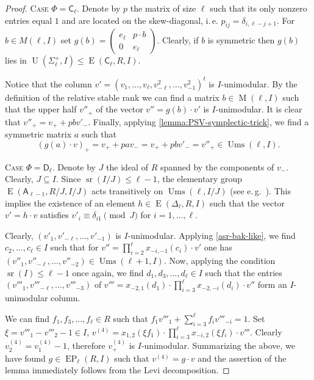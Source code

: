 \documentclass[11pt]{amsart}
\theoremstyle{plain}
\numberwithin{equation}{section}
\numberwithin{lemma}{section}
\theoremstyle{definition}
\theoremstyle{remark}
\DeclareMathOperator{\E}{E}
\DeclareMathOperator{\EP}{EP}
\DeclareMathOperator{\U}{U}
\DeclareMathOperator{\M}{M}
\DeclareMathOperator{\sr}{sr}
\DeclareMathOperator{\Ums}{Ums}
\newcommand{\rA}{\mathsf{A}}
\newcommand{\rC}{\mathsf{C}}
\newcommand{\rD}{\mathsf{D}}
\begin{document}
\begin{proof} 
\textsc{Case $\Phi=\rC_\ell$.}
Denote by $p$ the matrix of size $\ell$ such that its only nonzero entries equal $1$ and are located on the skew-diagonal, i.\,e. $p_{ij}=\delta_{i, \ell-j+1}$. 
For $b \in M(\ell, I)$ set $g(b)=\left(\begin{smallmatrix} e_\ell & p \cdot b \\ 0 & e_{\ell} \end{smallmatrix}\right)$.
Clearly, if $b$ is symmetric then $g(b)$ lies in $\U(\Sigma_\ell^+, I)\leq \E(\rC_\ell, R, I)$.

Notice that the column $v'=(v_1,\ldots,v_\ell, v_{-\ell}^2,\ldots,v_{-1}^2)^t$ is $I$-unimodular.
By the definition of the relative stable rank we can find a matrix $b\in \M(\ell,I)$ such that the upper half $v''_+$ of the vector $v''= g(b) \cdot v'$ is $I$-unimodular.
It is clear that $v''_+ = v_+ + pb v'_-$. 
Finally, applying \cref{lemma:PSV-symplectic-trick}, we find a symmetric matrix $a$ such that
\[ (g(a)\cdot v)_+=v_+ + pav_- = v_+ + pbv'_- = v''_+ \in \Ums(\ell, I). \]

\textsc{Case $\Phi=\rD_\ell$.} Denote by $J$ the ideal of $R$ spanned by the components of $v_{-}$. Clearly, $J \subseteq I$.
Since $\sr(I/J) \leqslant \ell-1$, the elementary group $\E(\rA_{\ell-1}, R/J, I/J)$ acts transitively on $\Ums(\ell, I/J)$ (see e.\,g.~\cite[Theorem~2.3c]{Va69}). 
This implies the existence of an element $h\in \E(\Delta_\ell, R, I)$ such that the vector $v' = h \cdot v$ satisfies $v'_i \equiv \delta_{i1} \pmod J$ for $i=1, \ldots, \ell$.

Clearly, $(v'_1, v'_{-\ell}, \ldots, v'_{-1})$ is $I$-unimodular.
Applying \cref{asr-bak-like}, we find $c_2, \ldots, c_\ell\in I$ such that for $v''= \prod_{i=2}^{\ell}x_{-i, -1}(c_i)\cdot v'$ one has
$(v''_1, v''_{-\ell},\ldots, v''_{-2})\in\Ums(\ell+1, I)$.
Now, applying the condition $\sr(I) \leqslant \ell-1$ once again, we find
$d_1, d_3, \ldots, d_{\ell}\in I$ such that the entries $(v'''_1, v'''_{-\ell}, \ldots, v'''_{-3})$
of $v'''=x_{-2, 1}(d_1) \cdot \prod_{i=3}^{\ell} x_{-2, -i}(d_i) \cdot v''$ form an $I$-unimodular column.

We can find $f_1, f_3,\ldots, f_\ell \in R$ such that $f_1v'''_1+\sum_{i=3}^\ell f_i v'''_{-i} = 1$.
Set $\xi = v'''_1-v'''_2-1 \in I$, $v^{(4)}=x_{1,2}(\xi f_1) \cdot \prod_{i=3}^\ell x_{-i,2}(\xi f_i) \cdot v'''$.
Clearly $v^{(4)}_2 = v^{(4)}_1-1$, therefore $v^{(4)}_+$ is $I$-unimodular.
Summarizing the above, we have found $g\in \EP_\ell(R, I)$ such that $v^{(4)}=g \cdot v$
and the assertion of the lemma immediately follows from the Levi decomposition. \end{proof}
\end{document}
